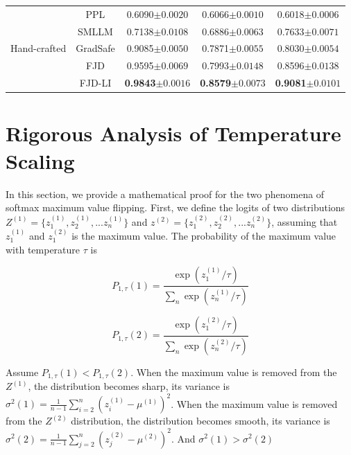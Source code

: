 \documentclass{article}
\begin{document}
\begin{table}[t]
\begin{tabular}{ccccc}
    \midrule
    \multirow{5}{*}{Hand-crafted}
    & PPL  & 0.6090\tiny{$\pm 0.0020$} & 0.6066\tiny{$\pm 0.0010$} &0.6018\tiny{$\pm 0.0006$}\\
    & SMLLM & 0.7138\tiny{$\pm 0.0108$} & 0.6886\tiny{$\pm 0.0063$} &0.7633\tiny{$\pm 0.0071$}\\
    & GradSafe & 0.9085\tiny{$\pm 0.0050$} & 0.7871\tiny{$\pm 0.0055$} & 0.8030\tiny{$\pm 0.0054$} \\
    & FJD & 0.9595\tiny{$\pm 0.0069$} & 0.7993\tiny{$\pm 0.0148$} &0.8596\tiny{$\pm 0.0138$}\\
    & FJD-LI & \textbf{0.9843}\tiny{$\pm 0.0016$} &  \textbf{0.8579}\tiny{$\pm 0.0073$}&\textbf{0.9081}\tiny{$\pm 0.0101$}\\
    
    \bottomrule
  \end{tabular}

\end{table}

\section{Rigorous Analysis of Temperature Scaling}\label{app:proof}

In this section, we provide a mathematical proof for the two phenomena of softmax maximum value flipping. First, we define the logits of two distributions $Z^{(1)}=\{z^{(1)}_1, z^{(1)}_2, ...z^{(1)}_n\}$ and $z^{(2)}=\{z^{(2)}_1, z^{(2)}_2, ...z^{(2)}_n\}$, assuming that $z^{(1)}_1$ and $z^{(2)}_1$ is the maximum value. The probability of the maximum value with temperature $\tau$ is 

\begin{equation}
    P_{1,\tau}(1)=\frac{\exp(z^{(1)}_1/\tau)}{\sum_n \exp(z^{(1)}_n/\tau)}
\end{equation}

\begin{equation}
    P_{1,\tau}(2)=\frac{\exp(z^{(2)}_1/\tau)}{\sum_n \exp(z^{(2)}_n/\tau)} 
\end{equation}

 Assume $P_{1,\tau}(1) < P_{1,\tau}(2)$. When the maximum value is removed from the $Z^{(1)}$, the distribution becomes sharp, its variance is $ \sigma^2(1)=\frac{1}{n-1}\sum_{i=2}^n(z^{(1)}_i-\mu^{(1)})^2 $. When the maximum value is removed from the $Z^{(2)}$ distribution, the distribution becomes smooth, its variance is $ \sigma^2(2)=\frac{1}{n-1}\sum_{j=2}^n(z^{(2)}_j-\mu^{(2)})^2 $. And $\sigma^2(1) > \sigma^2(2)$
\end{document}
